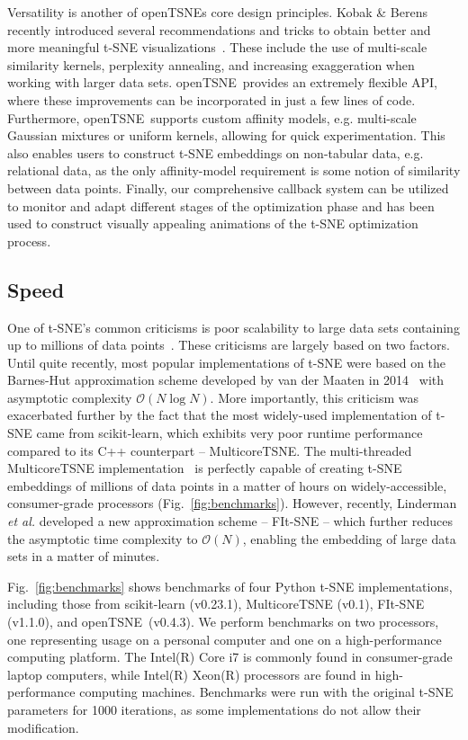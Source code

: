 \documentclass[twocolumn]{bmcart}
\newcommand{\opentsne}{\textsf{openTSNE}}
\begin{document}
Versatility is another of  \opentsne s core design principles. Kobak \& Berens recently introduced several recommendations and tricks to obtain better and more meaningful t-SNE visualizations~\cite{kobak2019art}. These include the use of multi-scale similarity kernels, perplexity annealing, and increasing exaggeration when working with larger data sets. \opentsne\ provides an extremely flexible API, where these improvements can be incorporated in just a few lines of code. Furthermore, \opentsne\ supports custom affinity models, e.g. multi-scale Gaussian mixtures or uniform kernels, allowing for quick experimentation. This also enables users to construct t-SNE embeddings on non-tabular data, e.g. relational data, as the only affinity-model requirement is some notion of similarity between data points. Finally, our comprehensive callback system can be utilized to monitor and adapt different stages of the optimization phase and has been used to construct visually appealing animations of the t-SNE optimization process.

\subsection*{Speed}

One of t-SNE's common criticisms is poor scalability to large data sets containing up to millions of data points~\cite{becht2019dimensionality}. These criticisms are largely based on two factors. Until quite recently, most popular implementations of t-SNE were based on the Barnes-Hut approximation scheme developed by van der Maaten in 2014~\cite{van2014accelerating} with asymptotic complexity $\mathcal{O}(N \log N)$. More importantly, this criticism was exacerbated further by the fact that the most widely-used implementation of t-SNE came from \textsf{scikit-learn}, which exhibits very poor runtime performance compared to its C++ counterpart -- \textsf{MulticoreTSNE}. The multi-threaded \textsf{MulticoreTSNE} implementation~\cite{Ulyanov2016} is perfectly capable of creating t-SNE embeddings of millions of data points in a matter of hours on widely-accessible, consumer-grade processors (Fig.~\ref{fig:benchmarks}). However, recently, Linderman \textit{et al.} developed a new approximation scheme -- FIt-SNE -- which further reduces the asymptotic time complexity to $\mathcal{O}(N)$, enabling the embedding of large data sets in a matter of minutes.

Fig.~\ref{fig:benchmarks} shows benchmarks of four Python t-SNE implementations, including those from \textsf{scikit-learn} (v0.23.1), \textsf{MulticoreTSNE} (v0.1), \textsf{FIt-SNE} (v1.1.0), and \opentsne\ (v0.4.3). We perform benchmarks on two processors, one representing usage on a personal computer and one on a high-performance computing platform. The Intel(R) Core i7 is commonly found in consumer-grade laptop computers, while Intel(R) Xeon(R) processors are found in high-performance computing machines. Benchmarks were run with the original t-SNE parameters for 1000 iterations, as some implementations do not allow their modification.
\end{document}
